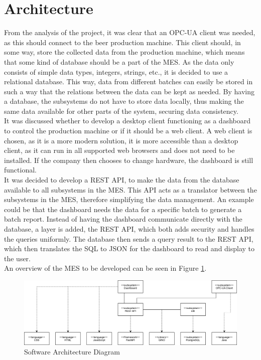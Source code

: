 \section{Architecture}
From the analysis of the project, it was clear that an OPC-UA
client was needed, as this should connect to the beer production machine. This
client should, in some way, store the collected data from the production machine,
which means that some kind of database should be a part of the MES. As the data
only consists of simple data types, integers, strings, etc., it is decided
to use a relational database. This way, data from different batches can easily
be stored in such a way that the relations between the data can be kept as
needed. By having a database, the subsystems do not have to store data
locally, thus making the same data available for other parts of the system,
securing data consistency. \\

It was discussed whether to develop a desktop client functioning as a dashboard
to control the production machine or if it should be a web client. A web client 
is chosen, as it is a more modern solution, it is more accessible than a desktop
client, as it can run in all supported web browsers and does not need to be
installed. If the company then chooses to change hardware, the dashboard is
still functional. \\

It was decided to develop a REST API, to make the data from the database
available to all subsystems in the MES. This API acts as a translator
between the subsystems in the MES, therefore simplifying the data management.
An example could be that the dashboard needs the data for a specific batch to
generate a batch report. Instead of having the dashboard communicate directly
with the database, a layer is added, the REST API, which both adds security and
handles the queries uniformly. The database then sends a query result to
the REST API, which then translates the SQL to JSON for the dashboard to read
and display to the user. \\

An overview of the MES to be developed can be seen in Figure
\ref{figure:architucture_diagram}.

\begin{figure}[ht]
	\centering 
	\includegraphics[width=1\textwidth]{images/diagrams/architecture_diagram.png}
	\caption{Software Architecture Diagram}
	\label{figure:architucture_diagram} 
\end{figure}
